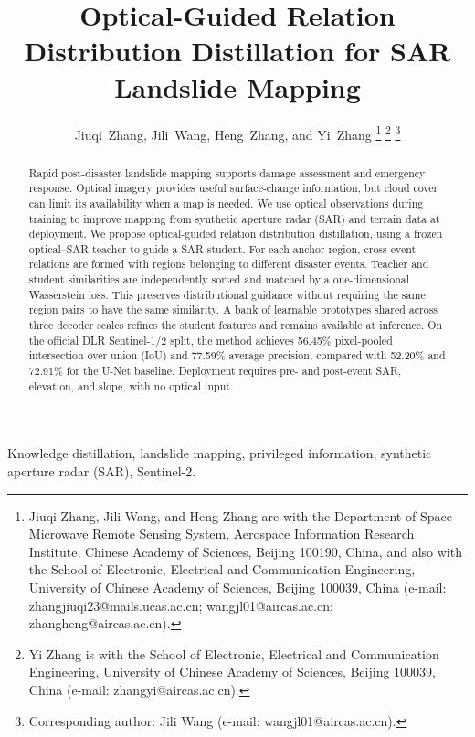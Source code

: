 \documentclass[journal]{IEEEtran}
\begin{document}
\title{Optical-Guided Relation Distribution Distillation for SAR Landslide Mapping}
\author{Jiuqi~Zhang, Jili~Wang, Heng~Zhang, and Yi~Zhang%
\thanks{Jiuqi Zhang, Jili Wang, and Heng Zhang are with the Department of Space Microwave Remote Sensing System, Aerospace Information Research Institute, Chinese Academy of Sciences, Beijing 100190, China, and also with the School of Electronic, Electrical and Communication Engineering, University of Chinese Academy of Sciences, Beijing 100039, China (e-mail: zhangjiuqi23@mails.ucas.ac.cn; wangjl01@aircas.ac.cn; zhangheng@aircas.ac.cn).}
\thanks{Yi Zhang is with the School of Electronic, Electrical and Communication Engineering, University of Chinese Academy of Sciences, Beijing 100039, China (e-mail: zhangyi@aircas.ac.cn).}
\thanks{Corresponding author: Jili Wang (e-mail: wangjl01@aircas.ac.cn).}
}
\IEEEaftertitletext{\vspace{-3pt}}

\maketitle

\begin{abstract}
Rapid post-disaster landslide mapping supports damage assessment and emergency response. Optical imagery provides useful surface-change information, but cloud cover can limit its availability when a map is needed. We use optical observations during training to improve mapping from synthetic aperture radar (SAR) and terrain data at deployment. We propose optical-guided relation distribution distillation, using a frozen optical--SAR teacher to guide a SAR student. For each anchor region, cross-event relations are formed with regions belonging to different disaster events. Teacher and student similarities are independently sorted and matched by a one-dimensional Wasserstein loss. This preserves distributional guidance without requiring the same region pairs to have the same similarity. A bank of learnable prototypes shared across three decoder scales refines the student features and remains available at inference. On the official DLR Sentinel-1/2 split, the method achieves 56.45\% pixel-pooled intersection over union (IoU) and 77.59\% average precision, compared with 52.20\% and 72.91\% for the U-Net baseline. Deployment requires pre- and post-event SAR, elevation, and slope, with no optical input.
\end{abstract}

\begin{IEEEkeywords}
Knowledge distillation, landslide mapping, privileged information, synthetic aperture radar (SAR), Sentinel-2.
\end{IEEEkeywords}
\end{document}
